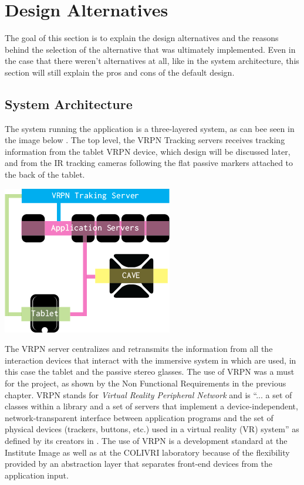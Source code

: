 \section{Design Alternatives}
The goal of this section is to explain the design alternatives and the reasons behind the selection of the alternative that was ultimately implemented. Even in the case that there weren't alternatives at all, like in the system architecture, this section will still explain the pros and cons of the default design.
\subsection{System Architecture}
The system running the application is a three-layered system, as can bee seen in the image below . The top level, the VRPN Tracking servers receives tracking information from the tablet VRPN device, which design will be discussed later, and from the IR tracking cameras following the flat passive markers attached to the back of the tablet.

\begin{center}
\includegraphics[scale=0.75]{Images/architecture.png}
\label{fig:architecture}
\end{center}

The VRPN server centralizes and retransmits the information from all the interaction devices that interact with the immersive system in which are used, in this case the tablet and the passive stereo glasses. The use of VRPN was a must for the project, as shown by the Non Functional Requirements in the previous chapter. VRPN stands for \emph{Virtual Reality Peripheral Network} and is ``... a set of classes within a library and a set of servers that implement a device-independent, network-transparent interface between application programs and the set of physical devices (trackers, buttons, etc.) used in a virtual reality (VR) system'' as defined by its creators in \cite{vrpn}. The use of VRPN is a development standard at the Institute Image as well as at the COLIVRI laboratory because of the flexibility provided by an abstraction layer that separates front-end devices from the application input.

